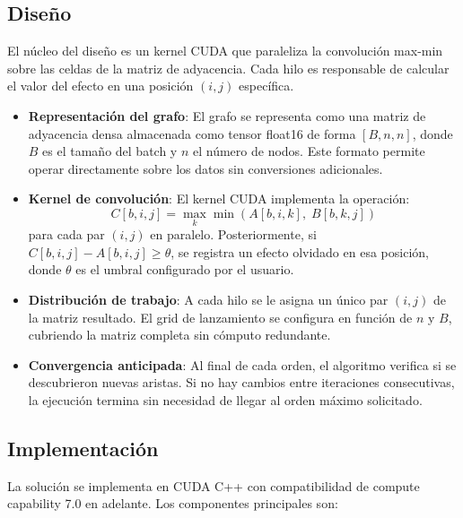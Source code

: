 \documentclass[conference]{IEEEtran}
\begin{document}
\subsection{Diseño}

El núcleo del diseño es un kernel CUDA que paraleliza la convolución max-min sobre las celdas de la matriz de adyacencia. Cada hilo es responsable de calcular el valor del efecto en una posición $(i,j)$ específica.

\begin{itemize}
    \item \textbf{Representación del grafo}: El grafo se representa como una matriz de adyacencia densa almacenada como tensor float16 de forma $[B, n, n]$, donde $B$ es el tamaño del batch y $n$ el número de nodos. Este formato permite operar directamente sobre los datos sin conversiones adicionales.

    \item \textbf{Kernel de convolución}: El kernel CUDA implementa la operación:
    \begin{equation}
      C[b,i,j] = \max_{k} \min\!\left(A[b,i,k],\; B[b,k,j]\right)
      \label{eq:maxmin}
    \end{equation}
    para cada par $(i,j)$ en paralelo. Posteriormente, si $C[b,i,j] - A[b,i,j] \geq \theta$, se registra un efecto olvidado en esa posición, donde $\theta$ es el umbral configurado por el usuario.

    \item \textbf{Distribución de trabajo}: A cada hilo se le asigna un único par $(i,j)$ de la matriz resultado. El grid de lanzamiento se configura en función de $n$ y $B$, cubriendo la matriz completa sin cómputo redundante.

    \item \textbf{Convergencia anticipada}: Al final de cada orden, el algoritmo verifica si se descubrieron nuevas aristas. Si no hay cambios entre iteraciones consecutivas, la ejecución termina sin necesidad de llegar al orden máximo solicitado.
\end{itemize}

\subsection{Implementación}

La solución se implementa en CUDA C++ con compatibilidad de compute capability 7.0 en adelante. Los componentes principales son:
\end{document}
